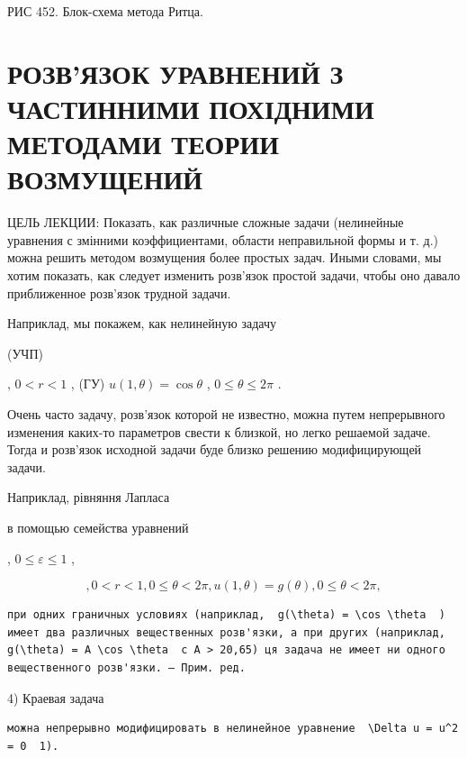 \documentclass[
  ukrainian,
]{article}
\begin{document}
РИС 452. Блок-схема метода Ритца.

\section{РОЗВ'ЯЗОК УРАВНЕНИЙ З ЧАСТИННИМИ ПОХІДНИМИ МЕТОДАМИ ТЕОРИИ
ВОЗМУЩЕНИЙ}\label{ux440ux43eux437ux432ux44fux437ux43eux43a-ux443ux440ux430ux432ux43dux435ux43dux438ux439-ux437-ux447ux430ux441ux442ux438ux43dux43dux438ux43cux438-ux43fux43eux445ux456ux434ux43dux438ux43cux438-ux43cux435ux442ux43eux434ux430ux43cux438-ux442ux435ux43eux440ux438ux438-ux432ux43eux437ux43cux443ux449ux435ux43dux438ux439}

ЦЕЛЬ ЛЕКЦИИ: Показать, как различные сложные задачи (нелинейные
уравнения с змінними коэффициентами, области неправильной формы и т. д.)
можна решить методом возмущения более простых задач. Иными словами, мы
хотим показать, как следует изменить розв'язок простой задачи, чтобы оно
давало приближенное розв'язок трудной задачи.

Наприклад, мы покажем, как нелинейную задачу

(УЧП)

, \(0 < r < 1\) , (ГУ) \(u(1, \theta) = \cos \theta\) ,
\(0 \le \theta \le 2\pi\) .

Очень часто задачу, розв'язок которой не известно, можна путем
непрерывного изменения каких-то параметров свести к близкой, но легко
решаемой задаче. Тогда и розв'язок исходной задачи буде близко решению
модифицирующей задачи.

Наприклад, рівняння Лапласа

в помощью семейства уравнений

, \(0 \le \varepsilon \le 1\) ,

\[
,  0 < r < 1  ,  0 \le \theta < 2\pi  ,  u(1, \theta) = g(\theta)  ,  0 \le \theta < 2\pi  ,
\]

\begin{verbatim}
при одних граничных условиях (наприклад,  g(\theta) = \cos \theta  ) имеет два различных вещественных розв'язки, а при других (наприклад,  g(\theta) = A \cos \theta  с A > 20,65) ця задача не имеет ни одного вещественного розв'язки. — Прим. ред.
\end{verbatim}

4) Краевая задача

\begin{verbatim}
можна непрерывно модифицировать в нелинейное уравнение  \Delta u = u^2 = 0  1).
\end{verbatim}
\end{document}
